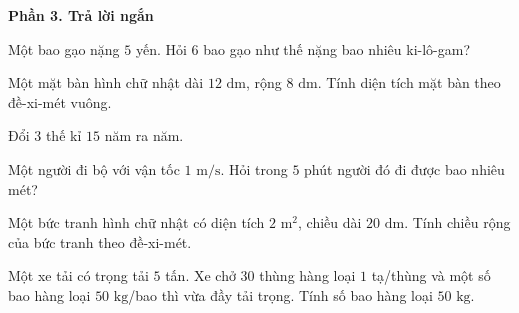 \textbf{Phần 3. Trả lời ngắn}

\begin{ex} %
Một bao gạo nặng $5$ yến. Hỏi $6$ bao gạo như thế nặng bao nhiêu ki-lô-gam?
\end{ex}

\begin{ex} %
Một mặt bàn hình chữ nhật dài $12\text{ dm}$, rộng $8\text{ dm}$. Tính diện tích mặt bàn theo đề-xi-mét vuông.
\end{ex}

\begin{ex} %
Đổi $3$ thế kỉ $15$ năm ra năm.
\end{ex}

\begin{ex} %
Một người đi bộ với vận tốc $1\text{ m/s}$. Hỏi trong $5$ phút người đó đi được bao nhiêu mét?
\end{ex}

\begin{ex} %
Một bức tranh hình chữ nhật có diện tích $2\text{ m}^2$, chiều dài $20\text{ dm}$. Tính chiều rộng của bức tranh theo đề-xi-mét.
\end{ex}

\begin{ex} %
Một xe tải có trọng tải $5$ tấn. Xe chở $30$ thùng hàng loại $1$ tạ/thùng và một số bao hàng loại $50\text{ kg}$/bao thì vừa đầy tải trọng. Tính số bao hàng loại $50\text{ kg}$.
\end{ex}
